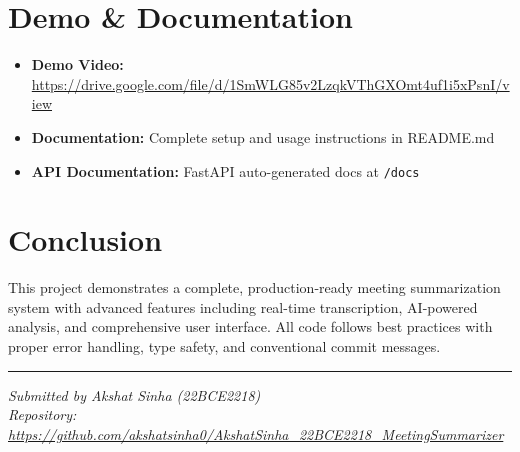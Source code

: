 \documentclass[11pt,a4paper]{article}
\begin{document}
\section*{Demo \& Documentation}

\begin{itemize}[leftmargin=*, itemsep=6pt]
    \item \textbf{Demo Video:} \url{https://drive.google.com/file/d/1SmWLG85v2LzqkVThGXOmt4uf1i5xPsnI/view}
    \item \textbf{Documentation:} Complete setup and usage instructions in README.md
    \item \textbf{API Documentation:} FastAPI auto-generated docs at \texttt{/docs}
\end{itemize}

\section*{Conclusion}

This project demonstrates a complete, production-ready meeting summarization system with advanced features including real-time transcription, AI-powered analysis, and comprehensive user interface. All code follows best practices with proper error handling, type safety, and conventional commit messages.

\vspace{1cm}

\begin{center}
    \rule{\textwidth}{0.4pt}
    
    \vspace{0.3cm}
    
    {\small \textit{Submitted by Akshat Sinha (22BCE2218)}}\\
    {\small \textit{Repository: \url{https://github.com/akshatsinha0/AkshatSinha_22BCE2218_MeetingSummarizer}}}
\end{center}
\end{document}
